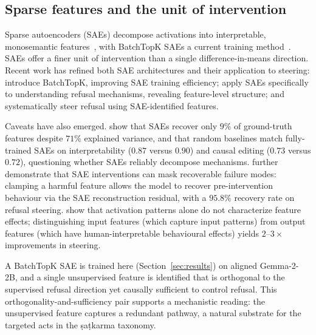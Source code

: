 \subsection{Sparse features and the unit of intervention}
Sparse autoencoders (SAEs) decompose activations into interpretable, monosemantic
features~\cite{cunningham2023sparse,templeton2024scaling}, with BatchTopK SAEs a
current training method~\cite{bussmann2024batchtopk}. SAEs offer a finer unit of
intervention than a single difference-in-means direction. Recent work has refined
both SAE architectures and their application to steering: \citet{bussmann2024batchtopk}
introduce BatchTopK, improving SAE training efficiency; \citet{huang2025understanding}
apply SAEs specifically to understanding refusal mechanisms, revealing feature-level
structure; and \citet{vig2025steering} systematically steer refusal using
SAE-identified features.

Caveats have also emerged. \citet{korznikov2026sanity} show that SAEs recover only
$9\%$ of ground-truth features despite $71\%$ explained variance, and that random
baselines match fully-trained SAEs on interpretability ($0.87$ versus $0.90$) and
causal editing ($0.73$ versus $0.72$), questioning whether SAEs reliably decompose
mechanisms. \citet{cui2026sae} further demonstrate that SAE interventions can mask
recoverable failure modes: clamping a harmful feature allows the model to recover
pre-intervention behaviour via the SAE reconstruction residual, with a $95.8\%$
recovery rate on refusal steering. \citet{arad2025good} show that activation patterns
alone do not characterize feature effects; distinguishing input features (which
capture input patterns) from output features (which have human-interpretable
behavioural effects) yields $2$--$3\times$ improvements in steering.

A BatchTopK SAE is trained here (Section~\ref{sec:results}) on aligned Gemma-2-2B,
and a single unsupervised feature is identified that is orthogonal to the supervised
refusal direction yet causally sufficient to control refusal. This
orthogonality-and-sufficiency pair supports a mechanistic reading: the unsupervised
feature captures a redundant pathway, a natural substrate for the targeted acts in
the \d{s}a\d{t}karma taxonomy.

